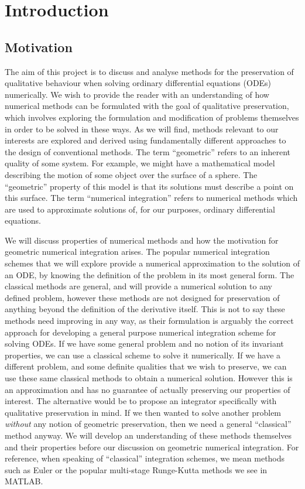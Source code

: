 \documentclass{report}
\theoremstyle{exampstyle} \newtheorem{example}[theorem]{Example}
\theoremstyle{exampstyle} \newtheorem{remark}[theorem]{Remark}
\theoremstyle{exampstyle} \newtheorem{definition}[theorem]{Definition}
\theoremstyle{exampstyle} \newtheorem{lemma}[theorem]{Lemma}
\begin{document}
\chapter{Introduction}

\section{Motivation}

The aim of this project is to discuss and analyse methods for the preservation of qualitative behaviour when solving ordinary differential equations (ODEs)  numerically.
We wish to provide the reader with an understanding of how numerical methods can be formulated with the goal of qualitative preservation,
which involves exploring the formulation and modification of problems themselves in order to be solved in these ways.
As we will find, methods relevant to our interests are explored and derived using fundamentally different approaches to the design of conventional methods.
The term ``geometric'' refers to an inherent quality of some system.
For example, we might have a mathematical model describing the motion of some object over the surface of a sphere.
The ``geometric'' property of this model is that its solutions must describe a point on this surface.
The term ``numerical integration'' refers to numerical methods which are used to approximate solutions of, for our purposes, ordinary differential equations.

We will discuss properties of numerical methods and how the motivation for geometric numerical integration arises.
The popular numerical integration schemes that we will explore provide a numerical approximation to the solution of an ODE,
by knowing the definition of the problem in its most general form.
The classical methods are general, and will provide a numerical solution to any defined problem, however these methods are not designed for preservation of anything beyond the definition of the derivative itself.
This is not to say these methods need improving in any way, as their formulation is arguably the correct approach for developing a general purpose numerical integration scheme for solving ODEs.
If we have some general problem and no notion of its invariant properties, we can use a classical scheme to solve it numerically.
If we have a different problem, and some definite qualities that we wish to preserve, we can use these same classical methods to obtain a numerical solution.
However this is an approximation and has no guarantee of actually preserving our properties of interest.
The alternative would be to propose an integrator specifically with qualitative preservation in mind.
If we then wanted to solve another problem \textit{without} any notion of geometric preservation, then we need a general ``classical'' method anyway.
We will develop an understanding of these methods themselves and their properties before our discussion on geometric numerical integration.
For reference, when speaking of ``classical'' integration schemes, we mean methods such as Euler or the popular multi-stage Runge-Kutta methods we see in MATLAB.
\end{document}
